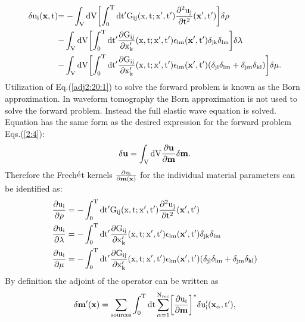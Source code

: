 \begin{equation}
\begin{split}
\rm{\delta u_i(\mathbf{x},t)} & \rm{= -\int_V dV \biggl[ \int_0^T dt' G_{ij}(x,t;x',t') \frac{\partial^2 u_j}{\partial t^2}(\mathbf{x'},t') \biggr] \delta \rho}\\ 
& \rm{- \int_V dV \biggl[ \int_0^T dt' \frac{\partial G_{ij}}{\partial x'_k}(x,t;x',t') \epsilon_{lm}(\mathbf{x'},t') \delta_{jk} \delta_{lm} \biggr] \delta \lambda}\\
& \rm{- \int_V dV \biggl[ \int_0^T dt' \frac{\partial G_{ij}}{\partial x'_k}(x,t;x',t') \epsilon_{lm}(\mathbf{x'},t') (\delta_{jl} \delta_{lm} + \delta_{jm} \delta_{kl}) \biggr] \delta \mu.}
\end{split}
\label{adj2:20:1}
\end{equation}
Utilization of Eq.(\ref{adj2:20:1}) to solve the forward problem is known as the Born approximation. In waveform tomography the Born approximation is not used to solve the forward problem. 
Instead the full elastic wave equation is solved. Equation  has the same form as the desired expression for the forward problem Eqs.(\ref{2:4}):
\begin{equation}
\rm{\delta \mathbf{u} = \int_V dV \frac{\partial \mathbf{u}}{\partial \mathbf{m}} \delta \mathbf{m}.}
\label{adj2:20:1:1}
\end{equation} 
Therefore the Frech$\rm{\acute{e}}$t kernels $\rm{\frac{\partial u_i}{\partial 
\mathbf{m(x)}}}$ for the individual material parameters can be identified as:
\begin{equation}
\begin{split}
\rm{\frac{\partial u_i}{\partial \mathbf{\rho}}} &= \rm{-\int_0^T dt' G_{ij}(x,t;x',t') \frac{\partial^2 u_j}{\partial t^2}(\mathbf{x'},t')} \\
\rm{\frac{\partial u_i}{\partial \mathbf{\lambda}}} &= \rm{-\int_0^T dt' \frac{\partial G_{ij}}{\partial x'_k}(x,t;x',t') \epsilon_{lm}(\mathbf{x'},t') \delta_{jk} \delta_{lm}} \\
\rm{\frac{\partial u_i}{\partial \mathbf{\mu}}} &= \rm{-\int_0^T dt' \frac{\partial G_{ij}}{\partial x'_k}(x,t;x',t') \epsilon_{lm}(\mathbf{x'},t') (\delta_{jl} \delta_{lm} + \delta_{jm} \delta_{kl}) } \\ 
\label{adj2:20:2}
\end{split}
\end{equation}
By definition the adjoint of the operator  can be written as 
\begin{equation}
\rm{\delta \mathbf{m'(x)} = \sum_{sources} \int_0^T dt \sum_{\rm{\alpha=1}}^{\rm{N_{rec}}} \biggl[\frac{\partial u_i}{\partial
\mathbf{m}} \biggl]^* \delta u_i'(\mathbf{x_\alpha},t'),}
\label{adj2:20:3}
\end{equation}
